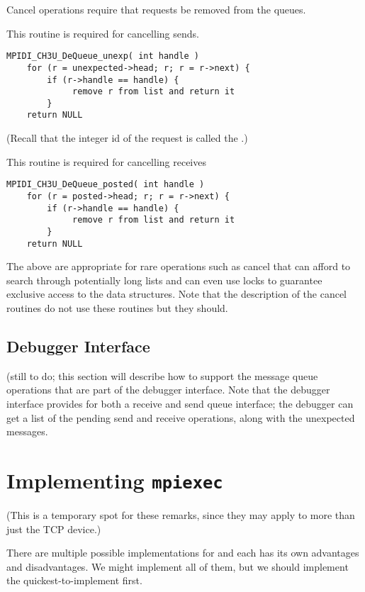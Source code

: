 \documentclass{article}
\def\texorpdfstring#1#2{#1}
\begin{document}
Cancel operations require that requests be removed from the queues.

This routine is required for cancelling sends.
\begin{verbatim}
MPIDI_CH3U_DeQueue_unexp( int handle )
    for (r = unexpected->head; r; r = r->next) {
        if (r->handle == handle) {
             remove r from list and return it
        }
    return NULL
\end{verbatim}
(Recall that the integer id of the request is called the .)

This routine is required for cancelling receives
\begin{verbatim}
MPIDI_CH3U_DeQueue_posted( int handle )
    for (r = posted->head; r; r = r->next) {
        if (r->handle == handle) {
             remove r from list and return it
        }
    return NULL
\end{verbatim}
The above are appropriate for rare operations such as cancel that can 
afford to search through potentially long lists and can even use locks
to guarantee exclusive access to the data structures.  Note that the
description of the cancel routines do not use these routines but they should.

\subsection{Debugger Interface}
(still to do; this section will describe how to support the message
queue operations that are part of the debugger interface.  Note that
the debugger interface provides for both a receive and send queue
interface; the debugger can get a list of the pending send and receive
operations, along with the unexpected messages.

\section{Implementing \texorpdfstring{\texttt{mpiexec}}{mpiexec}}
\label{sec:mpiexec}

(This is a temporary spot for these remarks, since they may apply to more than
just the TCP device.)

There are multiple possible implementations for  and each has
its own advantages and disadvantages.  We might implement all of them, but we
should implement the quickest-to-implement first.
\end{document}
